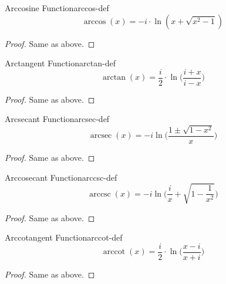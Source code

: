 \documentclass[a4paper]{article}
\begin{document}
\begin{mytheorem}{Arccosine Function}{arccos-def}
    \begin{equation}
        \arccos(x) = -i \cdot \ln(x + \sqrt{ x^2 - 1} )
    \end{equation}
    \begin{proof}
        Same as above.
    \end{proof}
\end{mytheorem}

\begin{mytheorem}{Arctangent Function}{arctan-def}
    \begin{equation}
        \arctan(x) = \frac{i}{2} \cdot \ln\Big(\frac{i+x}{i-x}\Big)
    \end{equation}
    \begin{proof}
        Same as above.
    \end{proof}
\end{mytheorem}

\begin{mytheorem}{Arcsecant Function}{arcsec-def}
    \begin{equation}
        \operatorname{arcsec}(x) = -i \ln \Big( \frac{1 \pm \sqrt{1 - x^2}}{x} \Big)
    \end{equation}
    \begin{proof}
        Same as above.
    \end{proof}
\end{mytheorem}

\begin{mytheorem}{Arccosecant Function}{arccsc-def}
    \begin{equation}
        \operatorname{arccsc}(x) = -i \ln \Big( \frac{i}{x}  + \sqrt{1 - \frac{1}{x^2}} \Big)
    \end{equation}
    \begin{proof}
        Same as above.
    \end{proof}
\end{mytheorem}

\begin{mytheorem}{Arccotangent Function}{arccot-def}
    \begin{equation}
        \operatorname{arccot}(x) = \frac{i}{2} \cdot \ln\Big(\frac{x-i}{x+i}\Big)
    \end{equation}
    \begin{proof}
        Same as above.
    \end{proof}
\end{mytheorem}
\end{document}
